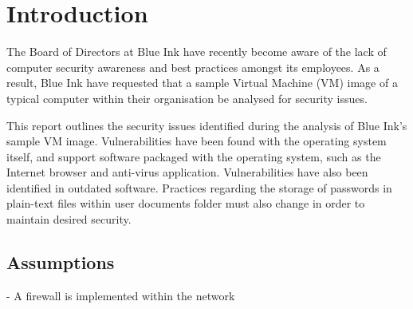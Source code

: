 \section{Introduction}

The Board of Directors at Blue Ink have recently become aware of the lack of computer security awareness and best practices amongst its employees. As a result, Blue Ink have requested that a sample Virtual Machine (VM) image of a typical computer within their organisation be analysed for security issues.

This report outlines the security issues identified during the analysis of Blue Ink's sample VM image. Vulnerabilities have been found with the operating system itself, and support software packaged with the operating system, such as the Internet browser and anti-virus application. Vulnerabilities have also been identified in outdated software. Practices regarding the storage of passwords in plain-text files within user documents folder must also change in order to maintain desired security.

\subsection{Assumptions}

- A firewall is implemented within the network